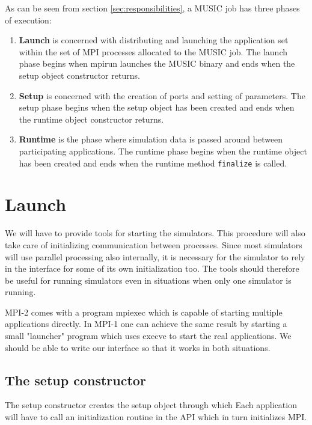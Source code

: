 \documentclass[a4paper]{report}
\newenvironment{metatext}%
{\color{blue}}%
{}
\begin{document}
As can be seen from section \ref{sec:responsibilities}, a MUSIC job
has three phases of execution:
\begin{enumerate}
  \item \textbf{Launch} is concerned with distributing and launching
    the application set within the set of MPI processes allocated to
    the MUSIC job.  The launch phase begins when mpirun launches the
    MUSIC binary and ends when the setup object constructor returns.
  \item \textbf{Setup} is concerned with the creation of ports and
    setting of parameters.  The setup phase begins when the setup
    object has been created and ends when the runtime object
    constructor returns.
  \item \textbf{Runtime} is the phase where simulation data is passed
    around between participating applications.  The runtime phase
    begins when the runtime object has been created and ends when the
    runtime method \verb|finalize| is called.
\end{enumerate}

\section{Launch}

We will have to provide tools for starting the simulators.  This
procedure will also take care of initializing communication between
processes.  Since most simulators will use parallel processing also
internally, it is necessary for the simulator to rely in the interface
for some of its own initialization too.  The tools should therefore be
useful for running simulators even in situations when only one
simulator is running.

\begin{metatext}
  MPI-2 comes with a program mpiexec which is capable of starting
  multiple applications directly.  In MPI-1 one can achieve the same
  result by starting a small "launcher" program which uses execve to
  start the real applications.  We should be able to write our interface
  so that it works in both situations.
\end{metatext}

\subsection{The setup constructor}

The setup constructor creates the setup object through which
Each application will have to call an initialization routine in the API
which in turn initializes MPI.
\end{document}

